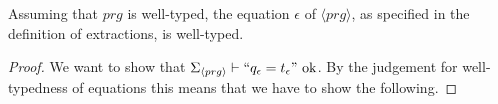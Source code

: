 \begin{lemma}
\label{lem:wtpeps}
Assuming that $prg$ is well-typed, the equation $\epsilon$ of $\langle prg \rangle$, as specified in the definition of extractions, is well-typed.

\begin{proof}
We want to show that $\Sigma_{\langle prg \rangle} \vdash `` q_\epsilon = t_\epsilon " \textrm{ ok}$. By the judgement for well-typedness of equations this means that we have to show the following.
%
%
%
%


\end{proof}
\end{lemma}
